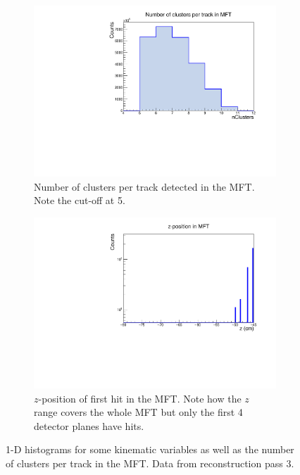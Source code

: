 \begin{figure}[h]
\begin{subfigure}[t]{.49\linewidth}
        \centering
        \includegraphics[width=\linewidth]{Plots/pass3_MFT/nClusters_pass3.pdf}
        \caption{Number of clusters per track detected in the MFT. Note the cut-off at 5.}
        \label{fig:MFTnClusters_pass3}
    \end{subfigure}
    \hfill
    \begin{subfigure}[t]{.49\linewidth}
        \centering
        \includegraphics[width=\linewidth]{Plots/pass3_MFT/Z_MFT_pass3.pdf}
        \caption{$z$-position of first hit in the MFT. Note how the $z$ range covers the whole MFT but only the first 4 detector planes have hits.}
        \label{fig:Z_MFT_pass3}
    \end{subfigure}
\caption{1-D histograms for some kinematic variables as well as the number of clusters per track in the MFT. Data from reconstruction pass 3. }
\label{fig:MFT_1D_pass3}
\end{figure}

